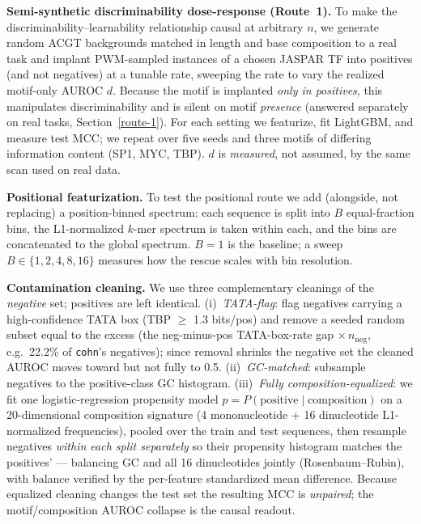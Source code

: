 \documentclass{ws-procs11x85}
\begin{document}
\textbf{Semi-synthetic discriminability dose-response (Route~1).} To make the
discriminability--learnability relationship causal at arbitrary $n$, we generate random ACGT backgrounds
matched in length and base composition to a real task and implant PWM-sampled instances of a chosen
JASPAR TF into positives (and not negatives) at a tunable rate, sweeping the rate to vary the realized
motif-only AUROC $d$. Because the motif is implanted \emph{only in positives}, this manipulates
discriminability and is silent on motif \emph{presence} (answered separately on real tasks,
Section~\ref{route-1}). For each setting we featurize, fit LightGBM, and measure test MCC; we repeat over
five seeds and three motifs of differing information content (SP1, MYC, TBP). $d$ is \emph{measured}, not
assumed, by the same scan used on real data.

\textbf{Positional featurization.} To test the positional route we add (alongside, not replacing) a
position-binned spectrum: each sequence is split into $B$ equal-fraction bins, the L1-normalized $k$-mer
spectrum is taken within each, and the bins are concatenated to the global spectrum. $B{=}1$ is the
baseline; a sweep $B\in\{1,2,4,8,16\}$ measures how the rescue scales with bin resolution.

\textbf{Contamination cleaning.} We use three complementary cleanings of the \emph{negative} set;
positives are left identical. (i)~\emph{TATA-flag}: flag negatives carrying a high-confidence TATA box
(TBP $\ge$ 1.3 bits/pos) and remove a seeded random subset equal to the excess (the neg-minus-pos
TATA-box-rate gap $\times\,n_{\mathrm{neg}}$, e.g.\ 22.2\% of \texttt{cohn}'s negatives); since removal
shrinks the negative set the cleaned AUROC moves toward but not fully to 0.5. (ii)~\emph{GC-matched}:
subsample negatives to the positive-class GC histogram. (iii)~\emph{Fully composition-equalized}: we fit
one logistic-regression propensity model $p=P(\text{positive}\mid\text{composition})$ on a 20-dimensional
composition signature (4 mononucleotide + 16 dinucleotide L1-normalized frequencies), pooled over the
train and test sequences, then resample negatives \emph{within each split separately} so their propensity
histogram matches the positives' --- balancing GC and all 16 dinucleotides jointly
(Rosenbaum--Rubin\cite{rosenbaum}), with balance verified by the per-feature standardized mean difference.
Because equalized cleaning changes the test set the resulting MCC is \emph{unpaired}; the
motif/composition AUROC collapse is the causal readout.
\end{document}

